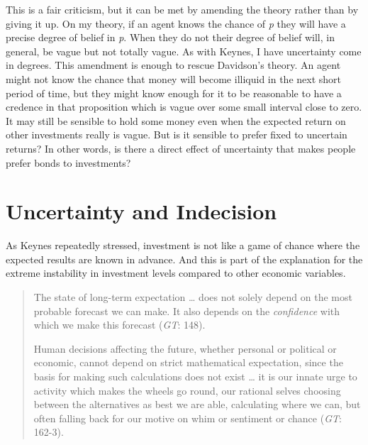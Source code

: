 \documentclass[
  10pt,
  letterpaper,
  DIV=11,
  numbers=noendperiod,
  twoside]{scrartcl}
\begin{document}
This is a fair criticism, but it can be met by amending the theory
rather than by giving it up. On my theory, if an agent knows the chance
of \emph{p} they will have a precise degree of belief in \emph{p}. When
they do not their degree of belief will, in general, be vague but not
totally vague. As with Keynes, I have uncertainty come in degrees. This
amendment is enough to rescue Davidson's theory. An agent might not know
the chance that money will become illiquid in the next short period of
time, but they might know enough for it to be reasonable to have a
credence in that proposition which is vague over some small interval
close to zero. It may still be sensible to hold some money even when the
expected return on other investments really is vague. But is it sensible
to prefer fixed to uncertain returns? In other words, is there a direct
effect of uncertainty that makes people prefer bonds to investments?

\section{Uncertainty and Indecision}\label{uncertainty-and-indecision}

As Keynes repeatedly stressed, investment is not like a game of chance
where the expected results are known in advance. And this is part of the
explanation for the extreme instability in investment levels compared to
other economic variables.

\begin{quote}
The state of long-term expectation \ldots{} does not solely depend on
the most probable forecast we can make. It also depends on the
\emph{confidence} with which we make this forecast (\emph{GT}: 148).

Human decisions affecting the future, whether personal or political or
economic, cannot depend on strict mathematical expectation, since the
basis for making such calculations does not exist \ldots{} it is our
innate urge to activity which makes the wheels go round, our rational
selves choosing between the alternatives as best we are able,
calculating where we can, but often falling back for our motive on whim
or sentiment or chance (\emph{GT}: 162-3).
\end{quote}
\end{document}
